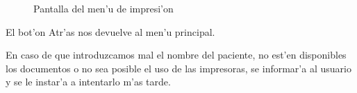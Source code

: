 \begin{enumerate}
\begin{itemize}
\begin{figure}[h!]
	\begin{center}
     	\end{center}
   	\caption{Pantalla del men'u de impresi'on}\label{fig:pantalla_imprimir}
\end{figure}

El bot'on Atr'as nos devuelve al men'u principal.

En caso de que introduzcamos mal el nombre del paciente, no est'en disponibles los documentos o no sea posible el uso de las impresoras, se informar'a al usuario y se le instar'a a intentarlo m'as tarde.


\end{itemize}
\end{enumerate}
